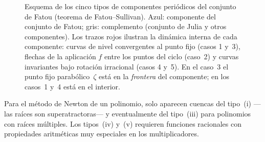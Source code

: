 \documentclass[11pt,a4paper]{article}
\theoremstyle{plain}
\theoremstyle{definition}
\theoremstyle{remark}
\begin{document}
\begin{figure}[htbp]
\caption{Esquema de los cinco tipos de componentes peri\'odicos del conjunto de Fatou
(teorema de Fatou--Sullivan).
Azul: componente del conjunto de Fatou; gris: complemento
(conjunto de Julia y otros componentes).
Los trazos rojos ilustran la din\'amica interna de cada componente:
curvas de nivel convergentes al punto fijo (casos 1 y~3),
flechas de la aplicaci\'on $f$ entre los puntos del ciclo (caso~2)
y curvas invariantes bajo rotaci\'on irracional (casos 4 y~5).
En el caso~3 el punto fijo parab\'olico~$\zeta$ est\'a en la \emph{frontera} del componente;
en los casos~1 y~4 est\'a en el interior.}
\label{fig:fatou-tipos}
\end{figure}


Para el método de Newton de un polinomio, solo aparecen cuencas del
tipo~(i) —las raíces son superatractoras— y eventualmente del tipo~(iii)
para polinomios con raíces múltiples.
Los tipos~(iv) y~(v) requieren funciones racionales con propiedades
aritméticas muy especiales en los multiplicadores.
\end{document}
